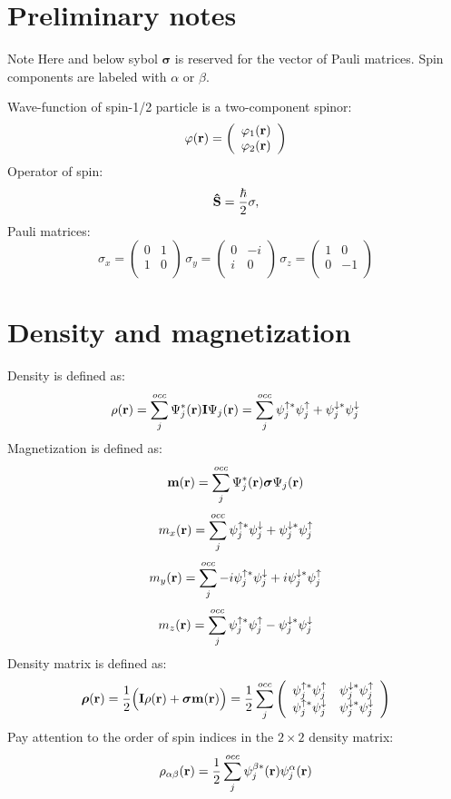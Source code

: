 \hypertarget{sym_section1}{}\section{Preliminary notes}\label{sym_section1}
\begin{DoxyNote}{Note}
Here and below sybol $ {\boldsymbol \sigma} $ is reserved for the vector of Pauli matrices. Spin components are labeled with $ \alpha $ or $ \beta$.
\end{DoxyNote}
Wave-\/function of spin-\/1/2 particle is a two-\/component spinor\+: \[ {\bf \varphi}({\bf r})=\left( \begin{array}{c} \varphi_1({\bf r}) \\ \varphi_2({\bf r}) \end{array} \right) \] Operator of spin\+: \[ {\bf \hat S}=\frac{\hbar}{2}{\bf \sigma}, \] Pauli matrices\+: \[ \sigma_x=\left( \begin{array}{cc} 0 & 1 \\ 1 & 0 \\ \end{array} \right) \, \sigma_y=\left( \begin{array}{cc} 0 & -i \\ i & 0 \\ \end{array} \right) \, \sigma_z=\left( \begin{array}{cc} 1 & 0 \\ 0 & -1 \\ \end{array} \right) \]\hypertarget{_d_f_t_section2}{}\section{Density and magnetization}\label{_d_f_t_section2}
Density is defined as\+: \[ \rho({\bf r}) = \sum_{j}^{occ} \Psi_{j}^{*}({\bf r}){\bf I} \Psi_{j}({\bf r}) = \sum_{j}^{occ} \psi_{j}^{\uparrow *} \psi_{j}^{\uparrow} + \psi_{j}^{\downarrow *} \psi_{j}^{\downarrow} \] Magnetization is defined as\+: \[ {\bf m}({\bf r}) = \sum_{j}^{occ} \Psi_{j}^{*}({\bf r}) {\boldsymbol \sigma} \Psi_{j}({\bf r}) \] \[ m_x({\bf r}) = \sum_{j}^{occ} \psi_{j}^{\uparrow *} \psi_{j}^{\downarrow} + \psi_{j}^{\downarrow *} \psi_{j}^{\uparrow} \] \[ m_y({\bf r}) = \sum_{j}^{occ} -i \psi_{j}^{\uparrow *} \psi_{j}^{\downarrow} + i \psi_{j}^{\downarrow *} \psi_{j}^{\uparrow} \] \[ m_z({\bf r}) = \sum_{j}^{occ} \psi_{j}^{\uparrow *} \psi_{j}^{\uparrow} - \psi_{j}^{\downarrow *} \psi_{j}^{\downarrow} \] Density matrix is defined as\+: \[ {\boldsymbol \rho}({\bf r}) = \frac{1}{2} \Big( {\bf I}\rho({\bf r}) + {\boldsymbol \sigma} {\bf m}({\bf r})\Big) = \frac{1}{2} \sum_{j}^{occ} \left( \begin{array}{cc} \psi_{j}^{\uparrow *} \psi_{j}^{\uparrow} & \psi_{j}^{\downarrow *} \psi_{j}^{\uparrow} \\ \psi_{j}^{\uparrow *} \psi_{j}^{\downarrow} & \psi_{j}^{\downarrow *} \psi_{j}^{\downarrow} \end{array} \right) \] Pay attention to the order of spin indices in the $ 2 \times 2 $ density matrix\+: \[ \rho_{\alpha \beta}({\bf r}) = \frac{1}{2} \sum_{j}^{occ} \psi_{j}^{\beta *}({\bf r})\psi_{j}^{\alpha}({\bf r}) \] 